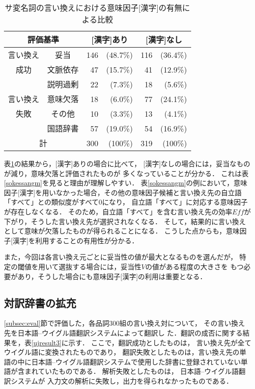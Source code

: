   \begin{table}[tb]
	\caption{\label{no_kanji_fact}サ変名詞の言い換えにおける意味因子[漢字]の有無による比較}
	\begin{center}
	 \begin{tabular}{c|c|rr|rr}\hline
	  \multicolumn{2}{c|}{評価基準} &  \multicolumn{2}{c|}{[漢字]あり} & \multicolumn{2}{c}{[漢字]なし} \\ \hline 
	  言い換え & 妥当 &  146 &(48.7\%)& 116 & (36.4\%)\\ 
	  成功     & 文脈依存 &  47 &(15.7\%)&  41 &(12.9\%)\\ \hline 
	           & 説明過剰 &  22 &(7.3\%)&  18 &(5.6\%)\\ 
	  言い換え & 意味欠落 &  18 &(6.0\%)&  77 &(24.1\%)\\ 
	  失敗     & その他   &  10 &(3.3\%)&  13 &(4.1\%)\\ 
	           & 国語辞書 &  57 &(19.0\%)&  54 &(16.9\%)\\ \hline 
		 \multicolumn{2}{c|}{計} & 300&(100\%) & 319 &(100\%)\\ \hline
	 \end{tabular}
	\end{center}
   \end{table}   

表\ref{no_kanji_fact}の結果から，[漢字]ありの場合に比べて，
[漢字]なしの場合には，妥当なものが減り，意味欠落と評価されたものが
多くなっていることが分かる．
これは表\ref{sokessangm}を見ると理由が理解しやすい．
表\ref{sokessangm}の例において，意味因子[漢字]を用いなかった場合，その他の意味因子候補と言い換え先の自立語「すべて」との類似度がすべて0になり，
自立語「すべて」に対応する意味因子が存在しなくなる．
そのため，自立語「すべて」を含む言い換え先の効率$Eff$が下がり，そうした言い換え先が選択されなくなる．
そして，結果的に言い換えとして意味が欠落したものが得られることになる．
こうした点からも，意味因子[漢字]を利用することの有用性が分かる．

また，今回は各言い換え元ごとに妥当性の値が最大となるものを選んだが，
特定の閾値を用いて選抜する場合には，妥当性$V$の値がある程度の大きさを
もつ必要があり，そうした場合にも意味因子[漢字]の利用は重要となる．

   \subsection{対訳辞書の拡充}
   \ref{subsec:eval}節で評価した，各品詞300組の言い換え対について，
   その言い換え先を日本語--ウイグル語翻訳システム\cite{ogawa}によって翻訳し
   た．翻訳の成否に関する結果を，表\ref{ujresult3}に示す．
   ここで，翻訳成功としたものは，
   言い換え先が全てウイグル語に変換されたものであり，
翻訳失敗としたものは，言い換え先の単語の中に日本語--ウイグル語翻訳システムで使用した辞書に登録されていない単語が含まれていたものである．
解析失敗としたものは，
日本語--ウイグル語翻訳システム\cite{ogawa}が
入力文の解析に失敗し，出力を得られなかったものである．


